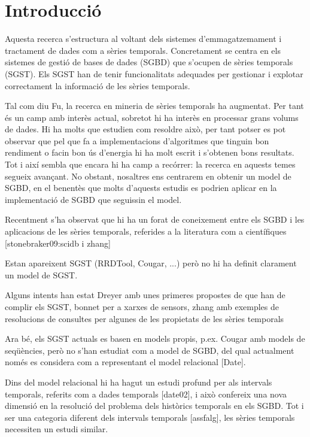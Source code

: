 \chapter{Introducció}




Aquesta recerca s'estructura al voltant dels sistemes
d'emmagatzemament i tractament de dades com a sèries temporals.
Concretament se centra en els sistemes de gestió de bases de dades
(SGBD) que s'ocupen de sèries temporals (SGST). Els SGST han de tenir  funcionalitats adequades per gestionar i
explotar correctament la informació de les sèries temporals.

Tal com diu Fu, la recerca en mineria de sèries temporals ha augmentat. Per tant és un camp amb interès actual, sobretot hi ha interès en processar grans volums de dades. Hi ha molts que estudien com resoldre això, per tant potser es pot observar que pel que fa a implementacions d'algoritmes que tinguin bon rendiment o facin bon ús d'energia hi ha molt escrit i s'obtenen bons resultats. Tot i així sembla que encara hi ha camp a recórrer: la recerca en aquests temes segueix avançant. No obstant, nosaltres ens centrarem en obtenir un model de SGBD, en el benentès que molts d'aquests estudis es podrien aplicar en la implementació de SGBD que seguissin el model.


Recentment s'ha observat que hi ha un forat de coneixement entre els SGBD i les aplicacions de les sèries temporals, referides a la literatura com a científiques [stonebraker09:scidb i zhang]


Estan apareixent SGST (RRDTool, Cougar, ...) però no hi ha definit clarament un model de SGST. 

Alguns intents han estat Dreyer amb unes primeres propostes de que han de complir els SGST, bonnet per a xarxes de sensors, zhang amb exemples de resolucions de consultes per algunes de les propietats de les sèries temporals

Ara bé, els SGST actuals es basen en models propis, p.ex. Cougar amb models de seqüències, però no s'han estudiat com a model de SGBD, del qual actualment només es considera com a representant el model relacional [Date]. 

Dins del model relacional hi ha hagut un estudi profund per als intervals temporals, referits com a dades temporals [date02], i això confereix una nova dimensió en la resolució del problema dels històrics temporals en els SGBD. Tot i ser una categoria diferent dels intervals temporals [assfalg], les sèries temporals necessiten un estudi similar.




